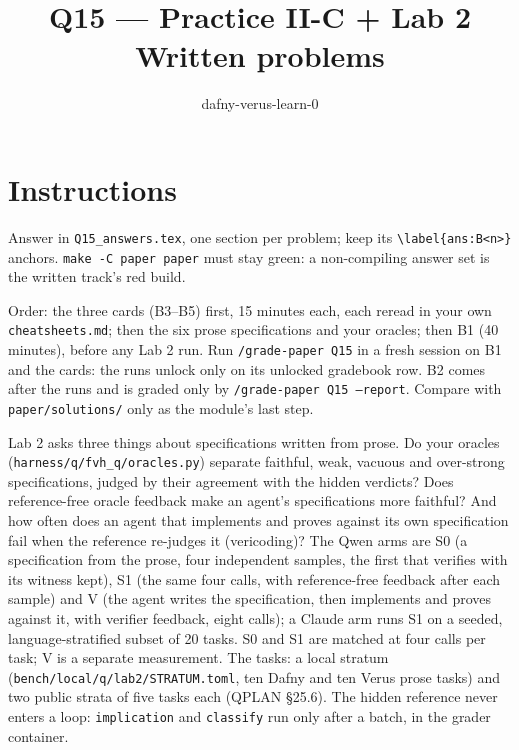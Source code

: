 \documentclass[11pt]{article}
\title{Q15 --- Practice II-C + Lab 2 \\ \large Written problems}
\author{dafny-verus-learn-0}
\date{}
\begin{document}
\maketitle
\sloppy

\section*{Instructions}
Answer in \texttt{Q15\_answers.tex}, one section per problem; keep its
\verb+\label{ans:B<n>}+ anchors. \texttt{make -C paper paper} must stay
green: a non-compiling answer set is the written track's red build.

Order: the three cards (B3--B5) first, 15 minutes each, each reread in your own
\texttt{cheatsheets.md}; then the six prose specifications and your oracles;
then B1 (40 minutes), before any Lab 2 run. Run \texttt{/grade-paper Q15} in a
fresh session on B1 and the cards: the runs unlock only on its unlocked
gradebook row. B2 comes after the runs and is graded only by
\texttt{/grade-paper Q15 --report}. Compare with \texttt{paper/solutions/}
only as the module's last step.

Lab 2 asks three things about specifications written from prose. Do your
oracles (\texttt{harness/q/fvh\_q/oracles.py}) separate faithful, weak,
vacuous and over-strong specifications, judged by their agreement with the
hidden verdicts? Does reference-free oracle feedback make an agent's
specifications more faithful? And how often does an agent that implements and
proves against its own specification fail when the reference re-judges it
(vericoding)? The Qwen arms are S0 (a specification from the prose, four
independent samples, the first that verifies with its witness kept), S1 (the
same four calls, with reference-free feedback after each sample) and V (the
agent writes the specification, then implements and proves against it, with
verifier feedback, eight calls); a Claude arm runs S1 on a seeded,
language-stratified subset of 20 tasks. S0 and S1 are matched at four calls
per task; V is a separate measurement. The tasks: a local stratum
(\texttt{bench/local/q/lab2/STRATUM.toml}, ten Dafny and ten Verus prose
tasks) and two public strata of five tasks each (QPLAN §25.6). The hidden
reference never enters a loop: \texttt{implication} and \texttt{classify}
run only after a batch, in the grader container.
\end{document}
